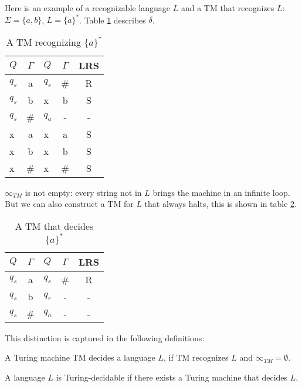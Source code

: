Here is an example of a recognizable language $L$ and a TM that
recognizes $L$: $\Sigma = \{a,b\}$, $L = \{a\}^*$. Table \ref{turing3}
describes $\delta$.

\begin{table}[ht]
\center
\begin{tabular}{|l|c||l|c|c|}
\hline
$Q$    & $\Gamma$   &  $Q$  &  $\Gamma$ &  LRS \\ \hline
$q_s$  &  a         &  $q_s$&   \#      &  R   \\
$q_s$  &  b         &  x    &    b      &  S   \\
$q_s$  &  \#        &  $q_a$&    -      &  -   \\
x      &  a         &  x    &    a      &  S   \\
x      &  b         &  x    &    b      &  S   \\
x      &  \#        &  x    &    \#     &  S   \\
\hline
\end{tabular}
\caption{A TM recognizing $\{a\}^*$} \label{turing3}
\end{table}
$\infty_{TM}$ is not empty: every string not in $L$ brings the machine
in an infinite loop. But we can also construct a TM for $L$ that always
halts, this is shown in table \ref{turing4}.

\begin{table}[ht]
\center
\begin{tabular}{|l|c||l|c|c|}
\hline
$Q$    & $\Gamma$   &  $Q$  &  $\Gamma$ &  LRS \\ \hline
$q_s$  &  a         &  $q_s$&   \#      &  R   \\
$q_s$  &  b         &  $q_r$&    -      &  -   \\
$q_s$  &  \#        &  $q_a$&    -      &  -   \\
\hline
\end{tabular}
\caption{A TM that decides $\{a\}^*$} \label{turing4}
\end{table}

This distinction is captured in the following definitions:

\begin{definition}[To decide]
A Turing machine TM decides a language $L$, if TM recognizes $L$ and
$\infty_{TM} = \emptyset$.
\end{definition}

\begin{definition}
A language $L$ is Turing-decidable if there exists a Turing machine that
decides $L$.
\end{definition}

